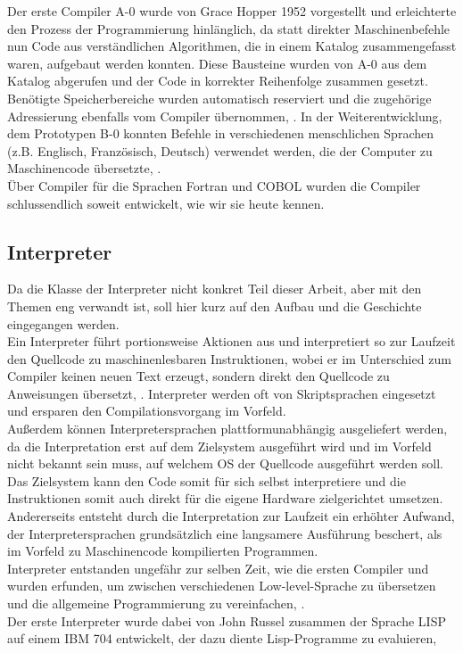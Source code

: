 Der erste Compiler A-0 wurde von Grace Hopper 1952 vorgestellt und erleichterte den Prozess der Programmierung hinlänglich, da statt direkter Maschinenbefehle nun Code aus verständlichen Algorithmen, die in einem Katalog zusammengefasst waren, aufgebaut werden konnten. Diese Bausteine wurden von A-0 aus dem Katalog abgerufen und der Code in korrekter Reihenfolge zusammen gesetzt. Benötigte Speicherbereiche wurden automatisch reserviert und die zugehörige Adressierung ebenfalls vom Compiler übernommen, \cite[vgl. Beyer 2012, S.222ff]{Beyer2012}. In der Weiterentwicklung, dem Prototypen B-0 konnten Befehle in verschiedenen menschlichen Sprachen (z.B. Englisch, Französisch, Deutsch) verwendet werden, die der Computer zu Maschinencode übersetzte, \cite[vg. Beyer 2012, S.271ff]{Beyer2012}.\\
Über Compiler für die Sprachen Fortran und COBOL wurden die Compiler schlussendlich soweit entwickelt, wie wir sie heute kennen. 

\subsection{Interpreter} \label{ch_interpreter}
Da die Klasse der Interpreter nicht konkret Teil dieser Arbeit, aber mit den Themen eng verwandt ist, soll hier kurz auf den Aufbau und die Geschichte eingegangen werden. \\
Ein Interpreter führt portionsweise Aktionen aus und interpretiert so zur Laufzeit den Quellcode zu maschinenlesbaren Instruktionen, wobei er im Unterschied zum Compiler keinen neuen Text erzeugt, sondern direkt den Quellcode zu Anweisungen übersetzt, \cite[vgl. Wagenknecht Hielscher 2022, S.4]{wagenknecht_hielscher_2022}. Interpreter werden oft von Skriptsprachen eingesetzt und ersparen den Compilationsvorgang im Vorfeld. \\
Außerdem können Interpretersprachen plattformunabhängig ausgeliefert werden, da die Interpretation erst auf dem Zielsystem ausgeführt wird und im Vorfeld nicht bekannt sein muss, auf welchem \ac{OS} der Quellcode ausgeführt werden soll. Das Zielsystem kann den Code somit für sich selbst interpretiere und die Instruktionen somit auch direkt für die eigene Hardware zielgerichtet umsetzen. \\
Andererseits entsteht durch die Interpretation zur Laufzeit ein erhöhter Aufwand, der Interpretersprachen grundsätzlich eine langsamere Ausführung beschert, als im Vorfeld zu Maschinencode kompilierten Programmen.\\
Interpreter entstanden ungefähr zur selben Zeit, wie die ersten Compiler und wurden erfunden, um zwischen verschiedenen Low-level-Sprache zu übersetzen und die allgemeine Programmierung zu vereinfachen, \cite[vgl. Bennet 1952, S.81 f]{Bennett1952}. \\
Der erste Interpreter wurde dabei von John Russel zusammen der Sprache LISP auf einem IBM 704 entwickelt, der dazu diente Lisp-Programme zu evaluieren, \cite[vgl. Stoyan S.299ff]{Stoyan1984}

